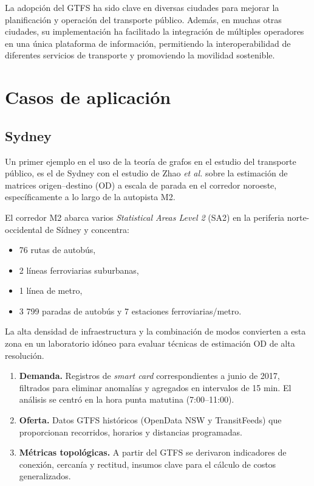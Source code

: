 \documentclass[11pt]{article}
\begin{document}
		La adopción del GTFS ha sido clave en diversas ciudades para mejorar la planificación y operación del transporte público. Además, en muchas otras ciudades, su implementación ha facilitado la integración de múltiples operadores en una única plataforma de información, permitiendo la interoperabilidad de diferentes servicios de transporte y promoviendo la movilidad sostenible.

	\section{Casos de aplicación}
		\subsection{Sydney}
		\label{sec:sydney}

		Un primer ejemplo en el uso de la teoría de grafos en el estudio del transporte público, es el de Sydney con el estudio de Zhao \textit{et al.} sobre la estimación de matrices origen–destino (OD) a escala de parada en el corredor noroeste, específicamente a lo largo de la autopista M2.

		El corredor M2 abarca varios \textit{Statistical Areas Level 2} (SA2) en la periferia norte-occidental de Sídney y concentra:
		\begin{itemize}
		  \item 76 rutas de autobús,
		  \item 2 líneas ferroviarias suburbanas,
		  \item 1 línea de metro,
		  \item 3 799 paradas de autobús y 7 estaciones ferroviarias/metro.
		\end{itemize}
		La alta densidad de infraestructura y la combinación de modos convierten a esta zona en un laboratorio idóneo para evaluar técnicas de estimación OD de alta resolución.

		\begin{enumerate}
		  \item \textbf{Demanda.} Registros de \emph{smart card} correspondientes a junio de 2017, filtrados para eliminar anomalías y agregados en intervalos de 15 min. El análisis se centró en la hora punta matutina (7:00–11:00).
		  \item \textbf{Oferta.} Datos GTFS históricos (OpenData NSW y TransitFeeds) que proporcionan recorridos, horarios y distancias programadas.
		  \item \textbf{Métricas topológicas.} A partir del GTFS se derivaron indicadores de conexión, cercanía y rectitud, insumos clave para el cálculo de costos generalizados.
		\end{enumerate}
\end{document}
